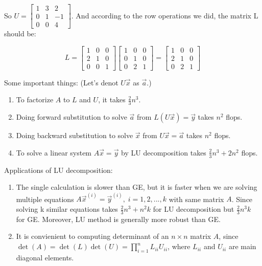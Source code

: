 	So $U = \begin{bmatrix} 1 & 3 & 2 \\ 0 & 1 & -1 \\ 0 & 0 & 4 \end{bmatrix}$. And according to the row operations we did, the matrix L should be:
	
	\[ L = \begin{bmatrix} 1 & 0 & 0 \\ 2 & 1 & 0 \\ 0 & 0 & 1\end{bmatrix} 
	\begin{bmatrix} 1 & 0 & 0 \\ 0 & 1 & 0 \\ 0 & 2 & 1\end{bmatrix} 
	= \begin{bmatrix} 1 & 0 & 0 \\ 2 & 1 & 0 \\ 0 & 2 & 1\end{bmatrix}\]
	
	Some important things: (Let's denot $U\vec{x}$ as $\vec{a}$.)
	\begin{enumerate}
		\item To factorize $A$ to $L$ and $U$, it takes $\frac{2}{3}n^3$.
		\item  Doing forward substitution to solve $\vec{a}$ from $L(U\vec{x}) = \vec{y}$ takes $n^2$ flops.
		\item Doing backward substitution to solve $\vec{x}$ from  $U\vec{x} = \vec{a}$ takes $n^2$ flops.
		\item To solve a linear system $A\vec{x} = \vec{y}$ by LU decomposition takes $\frac{2}{3}n^3 + 2n^2$ flops.
	\end{enumerate}
	
	Applications of LU decomposition:
	\begin{enumerate}
		\item The single calculation is slower than GE, but it is faster when we are solving multiple equations $A\vec{x}^{(i)} = \vec{y}^{(i)}, \; i=1,2,...,k$ with same matrix $A$. Since solving k similar equations takes $\frac{2}{3}n^3 + n^2 k$ for LU decomposition but $\frac{2}{3}n^3 k$ for GE. Moreover, LU method is generally more robust than GE.
		\item It is convienient to computing determinant of an $n\times n$ matrix $A$, since $\det(A) = \det(L)\det(U) = \prod_{i=1}^{n} L_{ii}U_{ii}$, where $L_{ii}$ and $U_{ii}$ are main diagonal elements. 
	\end{enumerate}
	
